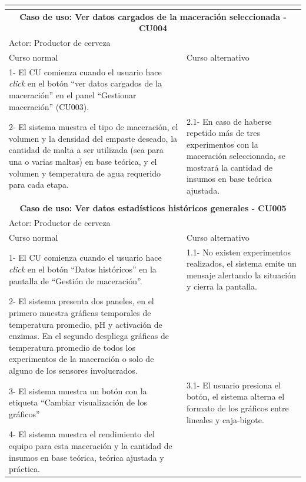 \begin{longtable}{|p{7cm}|p{7cm}|}
        \multicolumn{2}{c}{ }\\
        
        \hline
        \multicolumn{2}{|c|}{ \textbf{Caso de uso: Ver datos cargados de la maceración seleccionada - CU004}}\\
        \hline
        \multicolumn{2}{|l|}{Actor: Productor de cerveza} \\
        \hline
        Curso normal & Curso alternativo \\
        \hline
        1- El CU comienza cuando el usuario hace \textit{click} en el botón ``ver datos cargados de la maceración'' en el panel ``Gestionar maceración'' (CU003). & \\
        \hline
        2- El sistema muestra el tipo de maceración, el volumen y la densidad del empaste deseado, la cantidad de malta a ser utilizada (sea para una o varias maltas) en base teórica, y el volumen y temperatura de agua requerido para cada etapa. & 2.1- En caso de haberse repetido más de tres experimentos con la maceración seleccionada, se mostrará la cantidad de insumos en base teórica ajustada. \\
        \hline
        \multicolumn{2}{c}{ }\\
        \hline
        \multicolumn{2}{|c|}{\textbf{Caso de uso: Ver datos estadísticos históricos generales - CU005}}\\
        \hline
        \multicolumn{2}{|l|}{Actor: Productor de cerveza} \\
        \hline
        Curso normal & Curso alternativo \\
        \hline
        1- El CU comienza cuando el usuario hace \textit{click} en el botón ``Datos históricos'' en la pantalla de ``Gestión de maceración''. & 1.1- No existen experimentos realizados, el sistema emite un mensaje alertando la situación y cierra la pantalla.\\
        \hline
        2- El sistema presenta dos paneles, en el primero muestra gráficas temporales de temperatura promedio, pH y activación de enzimas. En el segundo despliega gráficas de temperatura promedio de todos los experimentos de la maceración o solo de alguno de los sensores involucrados. & \\
        \hline
        3- El sistema muestra un botón con la etiqueta ``Cambiar visualización de los gráficos''& 3.1- El usuario presiona el botón, el sistema alterna el formato de los gráficos entre lineales y caja-bigote. \\
        \hline
        4- El sistema muestra el rendimiento del equipo para esta maceración y la cantidad de insumos en base teórica, teórica ajustada y práctica. & \\
        \hline
        

\end{longtable}

